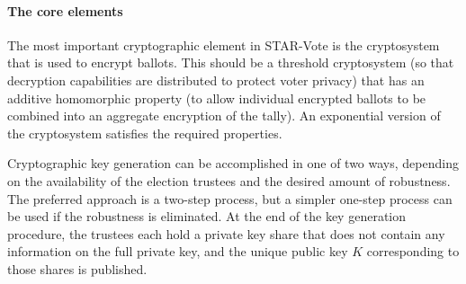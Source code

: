 \label{sec:crypto}



\paragraph{The core elements}
\label{sec:crypto-core}


The most important cryptographic element in STAR-Vote is the cryptosystem
that is used to encrypt ballots.  This should be a threshold cryptosystem
(so that decryption capabilities are distributed to protect voter privacy)
that has an additive homomorphic property (to allow individual encrypted ballots to
be combined into an aggregate encryption of the tally).  An exponential
version of the \elgamal cryptosystem satisfies the required properties.

Cryptographic key generation can be accomplished in one of two ways, depending on the availability of the election trustees and the desired
amount of robustness.  The preferred approach is a two-step process,
but a simpler one-step process can be used if the robustness is eliminated.
At the end of the key generation procedure, the trustees each hold a
private key share that does not contain any information on the full
private key, and the unique public key $K$ corresponding to those
shares is published.

